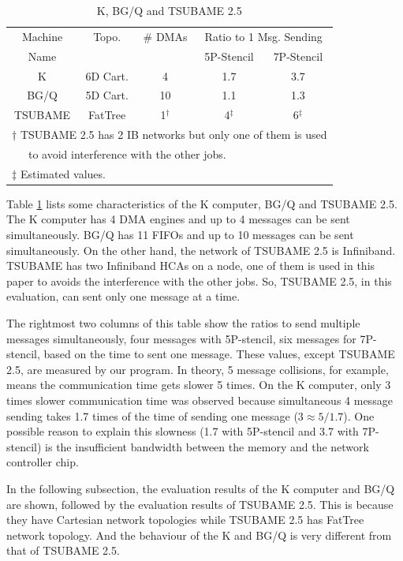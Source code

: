 \documentclass[Afour,times,sagev]{sagej}
\begin{document}
\begin{table}[htb]
\centering
\caption{K, BG/Q and TSUBAME 2.5}
\label{tbl:machines}
{\small
\begin{tabular}{c|c|c|c|c}
\hline
Machine & Topo. & \# DMAs &\multicolumn{2}{c}{Ratio to 1 Msg. Sending}\\
Name & &  & 5P-Stencil & 7P-Stencil \\
\hline
K & 6D Cart. & 4 & 1.7 & 3.7 \\
BG/Q\cite{Chen:2011:IBG:2063384.2063419} & 5D Cart. & 10 & 1.1 & 1.3 \\
TSUBAME & FatTree & 1$^{\dagger}$ & 4$^{\ddagger}$ & 6$^{\ddagger}$ \\
\hline
\multicolumn{5}{l}{\footnotesize $\dagger$ TSUBAME 2.5 has 2 IB
  networks but only one of them is used} \\
\multicolumn{5}{l}{\footnotesize ~~~to avoid
  interference with the other jobs.} \\
\multicolumn{5}{l}{\footnotesize $\ddagger$ Estimated values.} \\
\end{tabular}
}
\end{table}

Table \ref{tbl:machines} lists some characteristics of the K computer,
BG/Q and TSUBAME 2.5. The K computer has 4 DMA engines and up to 4
messages can be sent simultaneously. BG/Q has 11 FIFOs and up to 10
messages can be sent simultaneously. On the other hand, the network of
TSUBAME 2.5 is Infiniband\cite{infiniband}. TSUBAME has two
Infiniband HCAs on a node, one of them is used in this paper to avoids
the interference with the other jobs. So, TSUBAME 2.5, in this
evaluation, can sent only one message at a time.

The rightmost two columns of this table show the ratios to send
multiple messages simultaneously, four messages with 5P-stencil, six
messages for 7P-stencil, based on the time to sent one message. These
values, except TSUBAME 2.5, are measured by our program. In
theory, 5 message collisions, for example, means the communication
time gets slower 5 times. On the K computer, only 3 times
slower communication time was observed because simultaneous 4 message
sending takes 1.7 times of the time of sending one message ($3 \approx
5/1.7$)\cite{Hori-EuroMPI2015}. One possible reason to explain this
slowness (1.7 with 5P-stencil and 3.7 with 7P-stencil) is the
insufficient bandwidth between the memory and the network controller
chip.

In the following subsection, the evaluation results of the K computer
and BG/Q are shown, followed by the evaluation results of TSUBAME
2.5. This is because they have Cartesian network topologies
while TSUBAME 2.5 has FatTree network topology. And the behaviour of
the K and BG/Q is very different from that of TSUBAME 2.5.
\end{document}
